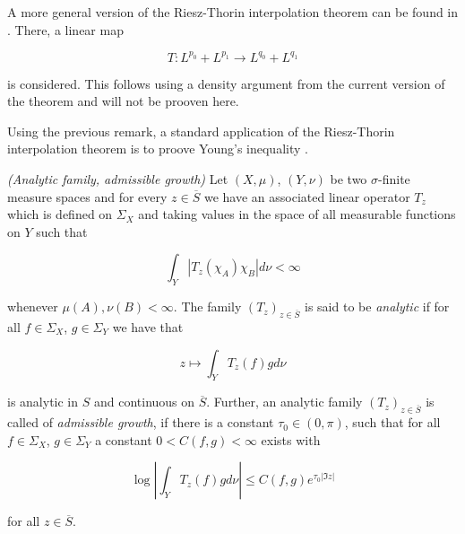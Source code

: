 \begin{remark*}
	A more general version of the Riesz-Thorin interpolation theorem can be found in \textup{\cite[200--202]{folland:real_analysis:1999}}. There, a linear map 

	\begin{equation*}
		T: L^{p_0} + L^{p_1} \rightarrow L^{q_0} + L^{q_1}
	\end{equation*}

	is considered. This follows using a density argument from the current version of the theorem and will not be prooven here.
	\label{rem:extension}
\end{remark*}

\begin{remark*}
	Using the previous remark, a standard application of the Riesz-Thorin interpolation theorem is to proove Young's inequality \textup{\cite[22--23]{grafakos:fourier:2014}}.
\end{remark*}

\begin{mdframed}
	\begin{definition}\emph{(Analytic family, admissible growth)}
		Let $(X,\mu)$, $(Y,\nu)$ be two $\sigma$-finite measure spaces and for every $z \in \overline{S}$ we have an associated linear operator $T_z$ which is defined on $\Sigma_X$ and taking values in the space of all measurable functions on $Y$ such that

		\begin{equation*}
			\int_Y \left| T_z(\chi_A)\chi_B \right| d\nu < \infty
		\end{equation*}

		whenever $\mu(A),\nu(B) < \infty$. The family $\left( T_z \right)_{z \in \overline{S}}$ is said to be \emph{analytic} if for all $f \in \Sigma_X$, $g \in \Sigma_Y$ we have that

		\begin{equation*}
			z \mapsto \int_Y T_z(f)gd\nu
		\end{equation*}

		is analytic in $S$ and continuous on $\overline{S}$. Further, an analytic family $\left( T_z \right)_{z \in \overline{S}}$ is called of \emph{admissible growth}, if there is a constant $\tau_0 \in (0,\pi)$, such that for all $f \in \Sigma_X$, $g \in \Sigma_Y$ a constant $0 < C(f,g) < \infty$ exists with

			\begin{equation*}
				\log\left| \int_Y T_z(f) g d\nu\right| \leqslant C(f,g)e^{\tau_0\left| \Im z\right|}
			\end{equation*}

			for all $z \in \overline{S}$.
	\end{definition}
\end{mdframed}

